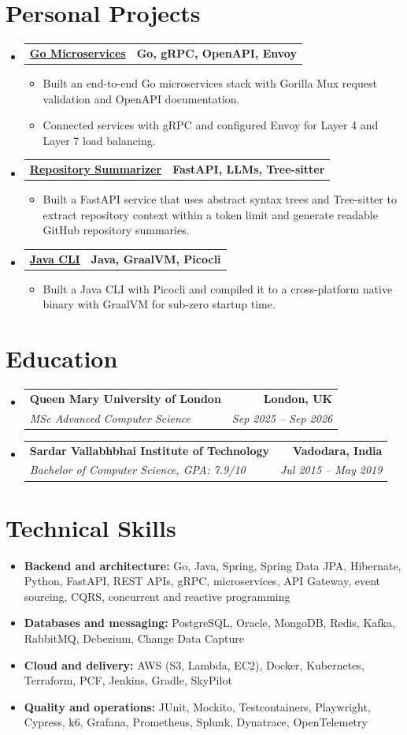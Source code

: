 \documentclass[a4paper,10pt]{article}
\makeatletter
\newcommand{\resumeItem}[1]{\item\small #1}
\newcommand{\resumeSubheading}[4]{
  \item[]
  \begin{tabular*}{\textwidth}{l@{\extracolsep{\fill}}r}
    \textbf{#1} & \textbf{\small #2} \\
    \textit{\small #3} & \textit{\small #4}
  \end{tabular*}\vspace{-3pt}
}
\newcommand{\resumeProjectHeading}[2]{
  \item[]
  \begin{tabular*}{\textwidth}{l@{\extracolsep{\fill}}r}
    \textbf{#1} & \textbf{\small #2}
  \end{tabular*}\vspace{-4pt}
}
\newcommand{\resumeSubHeadingListStart}{\begin{itemize}[leftmargin=0pt,label={},itemsep=1pt,topsep=1pt]}
\newcommand{\resumeSubHeadingListEnd}{\end{itemize}}
\newcommand{\resumeItemListStart}{\begin{itemize}[leftmargin=14pt,itemsep=1.4pt,topsep=2pt,parsep=0pt]}
\newcommand{\resumeItemListEnd}{\end{itemize}\vspace{1pt}}
\makeatother
\begin{document}
\section{Personal Projects}
\resumeSubHeadingListStart
  \resumeProjectHeading{\href{https://github.com/aymanapatel/golang-microservices}{Go Microservices}}{Go, gRPC, OpenAPI, Envoy}
  \resumeItemListStart
    \resumeItem{Built an end-to-end Go microservices stack with Gorilla Mux request validation and OpenAPI documentation.}
    \resumeItem{Connected services with gRPC and configured Envoy for Layer 4 and Layer 7 load balancing.}
  \resumeItemListEnd

  \resumeProjectHeading{\href{https://github.com/aymanapatel/nebius-project}{Repository Summarizer}}{FastAPI, LLMs, Tree-sitter}
  \resumeItemListStart
    \resumeItem{Built a FastAPI service that uses abstract syntax trees and Tree-sitter to extract repository context within a token limit and generate readable GitHub repository summaries.}
  \resumeItemListEnd

  \resumeProjectHeading{\href{https://github.com/aymanapatel/java-cli}{Java CLI}}{Java, GraalVM, Picocli}
  \resumeItemListStart
    \resumeItem{Built a Java CLI with Picocli and compiled it to a cross-platform native binary with GraalVM for sub-zero startup time.}
  \resumeItemListEnd
\resumeSubHeadingListEnd

\section{Education}
\resumeSubHeadingListStart
  \resumeSubheading{Queen Mary University of London}{London, UK}{MSc Advanced Computer Science}{Sep 2025 -- Sep 2026}
  \resumeSubheading{Sardar Vallabhbhai Institute of Technology}{Vadodara, India}{Bachelor of Computer Science, GPA: 7.9/10}{Jul 2015 -- May 2019}
\resumeSubHeadingListEnd

\section{Technical Skills}
\begin{itemize}[leftmargin=0pt,label={},itemsep=2pt,topsep=1pt]
  \small
  \item \textbf{Backend and architecture:} Go, Java, Spring, Spring Data JPA, Hibernate, Python, FastAPI, REST APIs, gRPC, microservices, API Gateway, event sourcing, CQRS, concurrent and reactive programming
  \item \textbf{Databases and messaging:} PostgreSQL, Oracle, MongoDB, Redis, Kafka, RabbitMQ, Debezium, Change Data Capture
  \item \textbf{Cloud and delivery:} AWS (S3, Lambda, EC2), Docker, Kubernetes, Terraform, PCF, Jenkins, Gradle, SkyPilot
  \item \textbf{Quality and operations:} JUnit, Mockito, Testcontainers, Playwright, Cypress, k6, Grafana, Prometheus, Splunk, Dynatrace, OpenTelemetry
\end{itemize}
\end{document}

